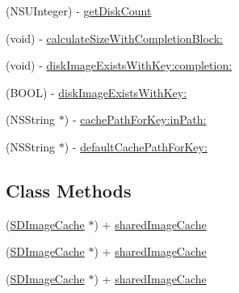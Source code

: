 \begin{DoxyCompactItemize}
\item 
(N\+S\+U\+Integer) -\/ \mbox{\hyperlink{interface_s_d_image_cache_abc59ee03f3afc7d9fa202a0790f8b5c0}{get\+Disk\+Count}}
\item 
(void) -\/ \mbox{\hyperlink{interface_s_d_image_cache_a276a37cdab08d116906f65040bad9c99}{calculate\+Size\+With\+Completion\+Block\+:}}
\item 
(void) -\/ \mbox{\hyperlink{interface_s_d_image_cache_a2baefc1300fcd3c57a25b5326dda8834}{disk\+Image\+Exists\+With\+Key\+:completion\+:}}
\item 
(B\+O\+OL) -\/ \mbox{\hyperlink{interface_s_d_image_cache_a67feea7b5568f427dfcf4f380abc1ba7}{disk\+Image\+Exists\+With\+Key\+:}}
\item 
(N\+S\+String $\ast$) -\/ \mbox{\hyperlink{interface_s_d_image_cache_a8dffa7933d6dcd6668331d03d29e2ad0}{cache\+Path\+For\+Key\+:in\+Path\+:}}
\item 
(N\+S\+String $\ast$) -\/ \mbox{\hyperlink{interface_s_d_image_cache_a591ff2cb8bcd813969b33c610c569bdc}{default\+Cache\+Path\+For\+Key\+:}}
\end{DoxyCompactItemize}
\subsection*{Class Methods}
\begin{DoxyCompactItemize}
\item 
(\mbox{\hyperlink{interface_s_d_image_cache}{S\+D\+Image\+Cache}} $\ast$) + \mbox{\hyperlink{interface_s_d_image_cache_a3a622a32640d15bf01e873275ea1e95e}{shared\+Image\+Cache}}
\item 
(\mbox{\hyperlink{interface_s_d_image_cache}{S\+D\+Image\+Cache}} $\ast$) + \mbox{\hyperlink{interface_s_d_image_cache_a3a622a32640d15bf01e873275ea1e95e}{shared\+Image\+Cache}}
\item 
(\mbox{\hyperlink{interface_s_d_image_cache}{S\+D\+Image\+Cache}} $\ast$) + \mbox{\hyperlink{interface_s_d_image_cache_a3a622a32640d15bf01e873275ea1e95e}{shared\+Image\+Cache}}
\end{DoxyCompactItemize}
